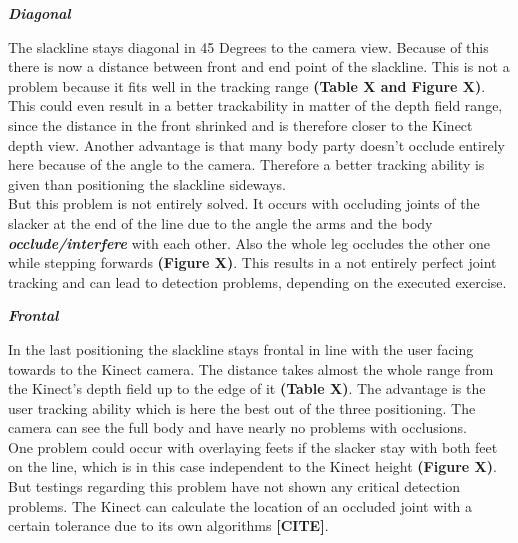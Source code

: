 \textit{\textbf{Diagonal}}

The slackline stays diagonal in 45 Degrees to the camera view. Because of this there is now a distance between front and end point of the slackline. This is not a problem because it fits well in the tracking range \textbf{(Table X and Figure X)}. This could even result in a better trackability in matter of the depth field range, since the distance in the front shrinked and is therefore closer to the Kinect depth view. Another advantage is that many body party doesn't occlude entirely here because of the angle to the camera. Therefore a better tracking ability is given than positioning the slackline sideways.
\\
But this problem is not entirely solved. It occurs with occluding joints of the slacker at the end of the line due to the angle the arms and the body \textbf{\textit{occlude/interfere}} with each other. Also the whole leg occludes the other one while stepping forwards \textbf{(Figure X)}. This results in a not entirely perfect joint tracking and can lead to detection problems, depending on the executed exercise.

\textit{\textbf{Frontal}}

In the last positioning the slackline stays frontal in line with the user facing towards to the Kinect camera. The distance takes almost the whole range from the Kinect’s depth field up to the edge of it \textbf{(Table X)}. The advantage is the user tracking ability which is here the best out of the three positioning. The camera can see the full body and have nearly no problems with occlusions.\\
One problem could occur with overlaying feets if the slacker stay with both feet on the line, which is in this case independent to the Kinect height \textbf{(Figure X)}. But testings regarding this problem have not shown any critical detection problems. The Kinect can calculate the location of an occluded joint with a certain tolerance due to its own algorithms \textbf{[CITE]}.

